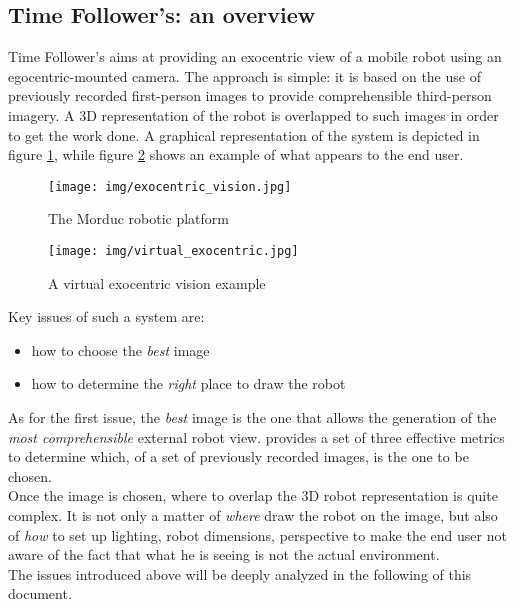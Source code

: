 \subsection{Time Follower's: an overview}
\label{sub:exo:time_follower}

Time Follower's aims at providing an exocentric view of a mobile 
robot using an egocentric-mounted camera. The approach is simple: it is 
based on the use of previously recorded first-person images to provide 
comprehensible third-person imagery. A 3D representation of the robot 
is overlapped to such images in order to get the work done. A graphical
representation of the system is depicted in figure \ref{fig:exocentric}, 
while figure \ref{fig:virtualexocentric} shows an example of what appears 
to the end user.

\begin{figure}[!h]
  \begin{center}
    \texttt{[image: img/exocentric\_vision.jpg]}
    \caption{The Morduc robotic platform}
    \label{fig:exocentric}
  \end{center}
\end{figure}

\begin{figure}[!h]
  \begin{center}
    \texttt{[image: img/virtual\_exocentric.jpg]}  %
    \caption{A virtual exocentric vision example}
    \label{fig:virtualexocentric}
  \end{center}
\end{figure}

Key issues of such a system are:

\begin{itemize}
\item how to choose the \textit{best} image
\item how to determine the \textit{right} place to draw the robot
\end{itemize}

As for the first issue, the \textit{best} image is the one that allows 
the generation of the \textit{most comprehensible} external robot view.
\cite{sugimoto} provides a set of three effective metrics to 
determine which, of a set of previously recorded images, is the 
one to be chosen.
\\
Once the image is chosen, where to overlap the 3D robot representation 
is quite complex. It is not only a matter of \textit{where} draw the robot
on the image, but also of \textit{how} to set up lighting, robot dimensions,
perspective to make the end user not aware of the fact that what he is
seeing is not the actual environment.
\\
The issues introduced above will be deeply analyzed in the following 
of this document.
